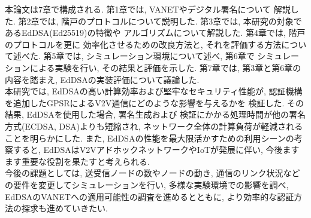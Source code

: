 本論文は7章で構成される. 第1章では, VANETやデジタル署名について
解説した. 第2章では, 階戸\cite{shinato}のプロトコルについて説明した. 
第3章では, 本研究の対象であるEdDSA(Ed25519)の特徴や
アルゴリズムについて解説した. 第4章では, 階戸のプロトコルを更に
効率化させるための改良方法と, それを評価する方法について述べた. 
第5章では, シミュレーション環境について述べ, 第6章で
シミュレーションによる実験を行い, その結果と評価を示した. 
第7章では, 第3章と第6章の内容を踏まえ, EdDSAの実装評価について議論した. \\
\indent 本研究では, EdDSAの高い計算効率および堅牢なセキュリティ性能が, 
認証機構を追加したGPSRによるV2V通信にどのような影響を与えるかを
検証した. その結果, EdDSAを使用した場合, 署名生成および
検証にかかる処理時間が他の署名方式(ECDSA, DSA)よりも短縮され, 
ネットワーク全体の計算負荷が軽減されることを明らかにした. 
また, EdDSAの性能を最大限活かすための利用シーンの考察すると, 
EdDSAはV2VアドホックネットワークやIoTが発展に伴い, 
今後ますます重要な役割を果たすと考えられる.\\
\indent 今後の課題としては, 送受信ノードの数やノードの動き, 
通信のリンク状況などの要件を変更してシミュレーションを行い, 
多様な実験環境での影響を調べ, EdDSAのVANETへの適用可能性の調査を進めるとともに, 
より効率的な認証方法の探求も進めていきたい.

